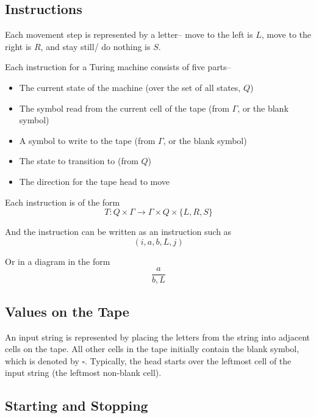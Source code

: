 \subsection*{Instructions}

Each movement step is represented by a letter-- move to the left is $L$, move to the right is $R$, and stay still/ do
 nothing is $S$.

\begin{definition*}{}{}
  Each instruction for a Turing machine consists of five parts--
  \begin{itemize}
    \item The current state of the machine (over the set of all states, $Q$)
    \item The symbol read from the current cell of the tape (from $\Gamma$, or the blank symbol)
    \item A symbol to write to the tape (from $\Gamma$, or the blank symbol)
    \item The state to transition to (from $Q$)
    \item The direction for the tape head to move
  \end{itemize}

  Each instruction is of the form
  \begin{equation*}
    T : Q \times \Gamma \rightarrow \Gamma \times Q \times \{L, R, S\}
  \end{equation*}

  And the instruction can be written as an instruction such as
  \begin{equation*}
    (i, a, b, L, j)
  \end{equation*}

  Or in a diagram in the form
  \begin{equation*}
    \frac{a}{b, L}
  \end{equation*}
\end{definition*}

\subsection*{Values on the Tape}

An input string is represented by placing the letters from the string into adjacent cells on the tape. All other cells
 in the tape initially contain the blank symbol, which is denoted by $\square$. Typically, the head starts over the
 leftmost cell of the input string (the leftmost non-blank cell).

\subsection*{Starting and Stopping}

